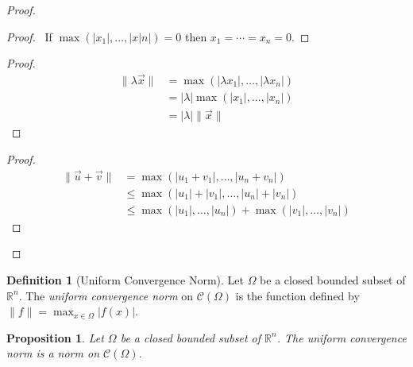 \documentclass{book}
\let\qed\relax
\newtheorem{prop}[ax]{Proposition}
\theoremstyle{definition}
\newtheorem{df}[ax]{Definition}
\begin{document}
\begin{proof}
\pf
{}
\begin{proof}
	\pf\ If $\max(|x_1|, \ldots, |x|n|) = 0$ then $x_1 = \cdots = x_n = 0$.
\end{proof}
\begin{proof}
	\pf
	\begin{align*}
		\|\lambda \vec{x}\| & = \max(|\lambda x_1|, \ldots, |\lambda x_n|) \\
		& = |\lambda| \max(|x_1|, \ldots, |x_n|) \\
		& = |\lambda| \|\vec{x}\|
	\end{align*}
\end{proof}
\begin{proof}
	\pf
	\begin{align*}
		\|\vec{u} + \vec{v}\| & = \max(|u_1 + v_1|, \ldots, |u_n + v_n|) \\
		& \leq \max(|u_1| + |v_1|, \ldots, |u_n| + |v_n|) \\
		& \leq \max(|u_1|, \ldots, |u_n|) + \max(|v_1|, \ldots, |v_n|)
	\end{align*}
\end{proof}
\qed
\end{proof}

\begin{df}[Uniform Convergence Norm]
Let $\Omega$ be a closed bounded subset of $\mathbb{R}^n$. The \emph{uniform convergence norm} on $\mathcal{C}(\Omega)$ is the function defined by $\| f \| = \max_{x \in \Omega} |f(x)|$.
\end{df}

\begin{prop}
Let $\Omega$ be a closed bounded subset of $\mathbb{R}^n$. The uniform convergence norm is a norm on $\mathcal{C}(\Omega)$.
\end{prop}
\end{document}
